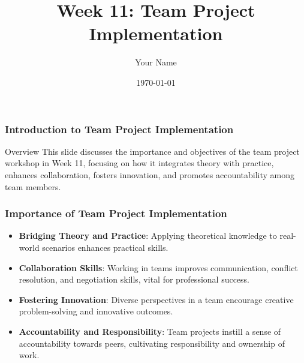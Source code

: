 \documentclass{beamer}
\title{Week 11: Team Project Implementation}
\author{Your Name}
\institute{Your Institution}
\date{\today}
\begin{document}
\frame{\titlepage}

\begin{frame}[fragile]
    \frametitle{Introduction to Team Project Implementation}
    \begin{block}{Overview}
        This slide discusses the importance and objectives of the team project workshop in Week 11, focusing on how it integrates theory with practice, enhances collaboration, fosters innovation, and promotes accountability among team members.
    \end{block}
\end{frame}

\begin{frame}[fragile]
    \frametitle{Importance of Team Project Implementation}
    \begin{itemize}
        \item \textbf{Bridging Theory and Practice}: Applying theoretical knowledge to real-world scenarios enhances practical skills.
        
        \item \textbf{Collaboration Skills}: Working in teams improves communication, conflict resolution, and negotiation skills, vital for professional success.
        
        \item \textbf{Fostering Innovation}: Diverse perspectives in a team encourage creative problem-solving and innovative outcomes.
        
        \item \textbf{Accountability and Responsibility}: Team projects instill a sense of accountability towards peers, cultivating responsibility and ownership of work.
    \end{itemize}
\end{frame}
\end{document}
